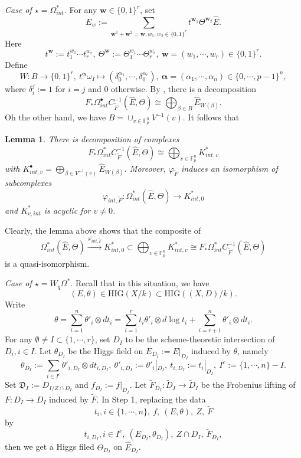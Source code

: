 \documentclass[12pt, a4paper]{article}
\newtheorem{lemma}{Lemma}[section]
\begin{document}
\emph{Case of $\star=\Omega^*_{int}$}. For any $\boldsymbol{w}\in\{0,1\}^r$, set
$$
E_w:=\sum_{\boldsymbol{w}^1+\boldsymbol{w}^2=\boldsymbol{w},w_1,w_2\in\{0,1\}^r}t^{\boldsymbol{w}_1}\Theta^{\boldsymbol{w}_2}\hat E.
$$
Here
$$
t^{\boldsymbol{w}}:=t_1^{w_1}\cdots t_r^{w_r},~\Theta^{\boldsymbol{w}}:=\Theta_1^{w_1}\cdots \Theta_r^{w_r},~\boldsymbol{w}=(w_1,\cdots,w_r)\in\{0,1\}^r.
$$
Define 
$$W:B\to \{0,1\}^r,~t^{\boldsymbol{\alpha}}\omega_I\mapsto(\delta_0^{\alpha_1},\cdots,\delta_0^{\alpha_r}),~\boldsymbol{\alpha}=(\alpha_1,\cdots,\alpha_n)\in\{0,\cdots,p-1\}^n,$$
where $\delta_i^j:=1$ for $i=j$ and $0$ otherwise. 
By \cite[Lemma 3.14]{SZ2}, there is a decomposition
$$
F_*\Omega^\bullet_{int}C_{\tilde F}^{-1}(\hat E,\Theta)\cong\bigoplus_{\beta\in B}\hat E_{W(\beta)}.
$$
Oh the other hand, we have $B=\cup_{v\in\mathbb F_p^n}V^{-1}(v)$. It follows that
\begin{lemma}
There is decomposition of complexes
$$
F_*\Omega^*_{int}C_{\tilde F}^{-1}(\hat E,\Theta)\cong\bigoplus_{v\in\mathbb F_p^n}K^*_{int,v}
$$
with $K^\bullet_{int,v}=\bigoplus_{\beta\in V^{-1}(v)}\hat E_{W(\beta)}$. Moreover, $\varphi_{\tilde F}$ induces an isomorphism of subcomplexes
$$
\varphi_{int,\tilde F}:\Omega^*_{int}(\hat E,\Theta)\to K^*_{int,0}
$$
and $K_{v,int}^*$ is acyclic for $v\neq0$.
\end{lemma}
Clearly, the lemma above shows that the composite of
$$\Omega_{int}^*(\hat E,\Theta)\stackrel{\varphi_{int,\tilde F}}{\to}K_{int,0}^*\subset\bigoplus_{v\in\mathbb F_p^n}K_{int,v}^*\cong F_*\Omega_{int}^*C_{\tilde F}^{-1}(\hat E,\Theta)$$ 
is a quasi-isomorphism.

\emph{Case of $\star=W_q\Omega^*$}. Recall that in this situation,  we have 
$$(E,\theta)\in\mathrm{HIG}(X/k)\subset\mathrm{HIG}((X,D)/k).$$
Write 
$$\theta=\sum_{i=1}^n\theta'_i\otimes dt_i=\sum_{i=1}^rt_i\theta'_i\otimes d\log t_i+\sum_{i=r+1}^n\theta'_i\otimes dt_i.$$
For any $\emptyset\neq I\subset\{1,\cdots,r\}$, set $D_I$ to be the scheme-theoretic intersection of $D_i,i\in I$. Let $\theta_{D_I}$ be the Higgs field on $E_{D_I}:=E|_{D_I}$ induced by $\theta$, namely
$$
\theta_{D_I}:=\sum_{i\in I^c}\theta'_{i,D_I}\otimes dt_{i,D_I},~\theta'_{i,D_I}:=\theta'_i|_{D_I},~t_{i,D_I}:=t_i|_{D_I},~I^c:=\{1,\cdots,n\}-I.
$$
Set $\mathfrak D_I:=D_{I/Z\cap D_I}$ and $f_{D_I}:=f|_{D_I}$. Let $\tilde F_{D_I}:\tilde D_I\to\tilde D_I$ be the Frobenius lifting of $F:D_I\to D_I$ induced by $\tilde F$. In Step 1, replacing the data 
$$
t_i,i\in\{1,\cdots,n\},~f,~(E,\theta),~Z,~\tilde F
$$
by
$$
t_{i,D_I},i\in I^c,~(E_{D_I},\theta_{D_I}),~Z\cap D_I,~\tilde F_{D_I},
$$
then we get a Higgs filed $\Theta_{D_I}$ on $\hat E_{D_I}$.
\end{document}
